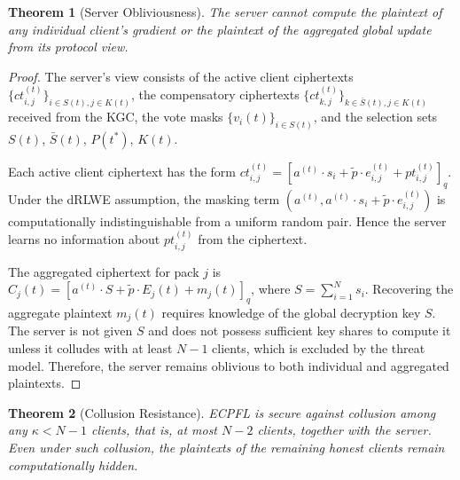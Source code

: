\documentclass[10pt]{article}
\newtheorem{theorem}{Theorem}
\begin{document}
\begin{theorem}[Server Obliviousness]
The server cannot compute the plaintext of any individual client's gradient or the plaintext of the aggregated global update from its protocol view.
\end{theorem}

\begin{proof}
The server's view consists of the active client ciphertexts $\{ct_{i,j}^{(t)}\}_{i\in S(t),j\in K(t)}$, the compensatory ciphertexts $\{ct_{k,j}^{(t)}\}_{k\in\bar{S}(t),j\in K(t)}$ received from the KGC, the vote masks $\{v_i(t)\}_{i\in S(t)}$, and the selection sets $S(t)$, $\bar{S}(t)$, $P(t^*)$, $K(t)$.

Each active client ciphertext has the form $ct_{i,j}^{(t)}=[a^{(t)}\cdot s_i+\tilde{p}\cdot e_{i,j}^{(t)}+pt_{i,j}^{(t)}]_q$. Under the dRLWE assumption, the masking term $(a^{(t)},a^{(t)}\cdot s_i+\tilde{p}\cdot e_{i,j}^{(t)})$ is computationally indistinguishable from a uniform random pair. Hence the server learns no information about $pt_{i,j}^{(t)}$ from the ciphertext.

The aggregated ciphertext for pack $j$ is $C_j(t)=[a^{(t)}\cdot S+\tilde{p}\cdot E_j(t)+m_j(t)]_q$, where $S=\sum_{i=1}^N s_i$. Recovering the aggregate plaintext $m_j(t)$ requires knowledge of the global decryption key $S$. The server is not given $S$ and does not possess sufficient key shares to compute it unless it colludes with at least $N-1$ clients, which is excluded by the threat model. Therefore, the server remains oblivious to both individual and aggregated plaintexts.
\end{proof}

\begin{theorem}[Collusion Resistance]
ECPFL is secure against collusion among any $\kappa<N-1$ clients, that is, at most $N-2$ clients, together with the server. Even under such collusion, the plaintexts of the remaining honest clients remain computationally hidden.
\end{theorem}
\end{document}
